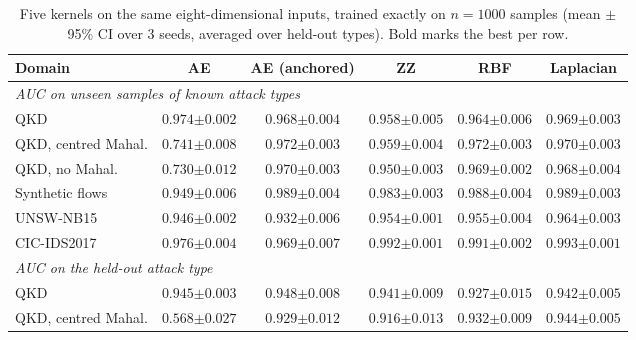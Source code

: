 \documentclass[pdflatex,sn-mathphys-num,lineno]{sn-jnl}
\theoremstyle{thmstyleone}
\begin{document}
\begin{table}[t]
  \centering
  \caption{Five kernels on the same eight-dimensional inputs, trained exactly on
  $n=1000$ samples (mean $\pm$ 95\% CI over 3 seeds, averaged over held-out types).
  Bold marks the best per row.}
  \label{tab:zz}
  \footnotesize
  \setlength{\tabcolsep}{3pt}
  \begin{tabular}{lccccc}
    \toprule
    Domain & AE & AE (anchored) & ZZ & RBF & Laplacian \\
    \midrule
    \multicolumn{6}{l}{\emph{AUC on unseen samples of known attack types}} \\
    QKD & $\mathbf{0.974{\scriptstyle\pm0.002}}$ & $0.968{\scriptstyle\pm0.004}$ & $0.958{\scriptstyle\pm0.005}$ & $0.964{\scriptstyle\pm0.006}$ & $0.969{\scriptstyle\pm0.003}$ \\
    QKD, centred Mahal. & $0.741{\scriptstyle\pm0.008}$ & $\mathbf{0.972{\scriptstyle\pm0.003}}$ & $0.959{\scriptstyle\pm0.004}$ & $\mathbf{0.972{\scriptstyle\pm0.003}}$ & $0.970{\scriptstyle\pm0.003}$ \\
    QKD, no Mahal. & $0.730{\scriptstyle\pm0.012}$ & $\mathbf{0.970{\scriptstyle\pm0.003}}$ & $0.950{\scriptstyle\pm0.003}$ & $0.969{\scriptstyle\pm0.002}$ & $0.968{\scriptstyle\pm0.004}$ \\
    Synthetic flows & $0.949{\scriptstyle\pm0.006}$ & $\mathbf{0.989{\scriptstyle\pm0.004}}$ & $0.983{\scriptstyle\pm0.003}$ & $0.988{\scriptstyle\pm0.004}$ & $\mathbf{0.989{\scriptstyle\pm0.003}}$ \\
    UNSW-NB15 & $0.946{\scriptstyle\pm0.002}$ & $0.932{\scriptstyle\pm0.006}$ & $0.954{\scriptstyle\pm0.001}$ & $0.955{\scriptstyle\pm0.004}$ & $\mathbf{0.964{\scriptstyle\pm0.003}}$ \\
    CIC-IDS2017 & $0.976{\scriptstyle\pm0.004}$ & $0.969{\scriptstyle\pm0.007}$ & $0.992{\scriptstyle\pm0.001}$ & $0.991{\scriptstyle\pm0.002}$ & $\mathbf{0.993{\scriptstyle\pm0.001}}$ \\
    \midrule
    \multicolumn{6}{l}{\emph{AUC on the held-out attack type}} \\
    QKD & $0.945{\scriptstyle\pm0.003}$ & $\mathbf{0.948{\scriptstyle\pm0.008}}$ & $0.941{\scriptstyle\pm0.009}$ & $0.927{\scriptstyle\pm0.015}$ & $0.942{\scriptstyle\pm0.005}$ \\
    QKD, centred Mahal. & $0.568{\scriptstyle\pm0.027}$ & $0.929{\scriptstyle\pm0.012}$ & $0.916{\scriptstyle\pm0.013}$ & $0.932{\scriptstyle\pm0.009}$ & $\mathbf{0.944{\scriptstyle\pm0.005}}$ \\

\end{tabular}
\end{table}
\end{document}
